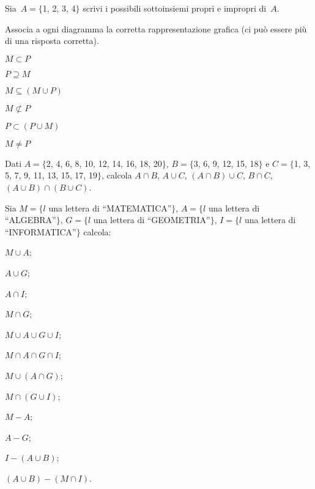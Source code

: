 \begin{esercizio}
\label{ese:5.96}
Sia~$A=\{$1, 2, 3, 4$\}$ scrivi i possibili sottoinsiemi propri e impropri di~$A$.
\end{esercizio}
\pagebreak
\begin{esercizio}
\label{ese:5.97}
Associa a ogni diagramma la corretta rappresentazione grafica (ci può essere più di una risposta corretta).

\TabPositions{5cm}
\begin{enumeratea}
 \item $M\subset P$ \tab\boxA\quad\boxB\quad\boxC\quad\boxD\quad\boxE
\item $P\supseteq M$ \tab\boxA\quad\boxB\quad\boxC\quad\boxD\quad\boxE
\item $M\subseteq (M\cup P)$ \tab\boxA\quad\boxB\quad\boxC\quad\boxD\quad\boxE
\item $M\not\subset P$ \tab\boxA\quad\boxB\quad\boxC\quad\boxD\quad\boxE
\item $P\subset (P\cup M)$ \tab\boxA\quad\boxB\quad\boxC\quad\boxD\quad\boxE
\item $M\neq P$ \tab\boxA\quad\boxB\quad\boxC\quad\boxD\quad\boxE
\end{enumeratea}
\begin{center}

\end{center}
\end{esercizio}

\begin{esercizio}
\label{ese:5.98}
Dati $A=\{$2, 4, 6, 8, 10, 12, 14, 16, 18, 20$\}$, $B=\{$3, 6, 9, 12, 15, 18$\}$ e
$C=\{$1, 3, 5, 7, 9, 11, 13, 15, 17, 19$\}$, calcola
$A\cap B$, $A\cup C$, $(A\cap B)\cup C$, $B\cap C$, $(A\cup B)\cap(B\cup C)$.
\end{esercizio}

\begin{esercizio}
\label{ese:5.99}
Sia $M=\{l$ una lettera di ``MATEMATICA''$\}$, $A=\{l$ una lettera di ``ALGEBRA''$\}$, $G=\{l$ una lettera di ``GEOMETRIA''$\}$, $I=\{l$ una lettera di ``INFORMATICA''$\}$ calcola:
\begin{multicols}{3}
\begin{enumeratea}
 \item $M\cup A$;
 \item $A\cup G$;
 \item $A\cap I$;
 \item $M\cap G$;
 \item $M\cup A \cup G \cup I$;
 \item $M\cap A \cap G \cap I$;
 \item $M\cup (A\cap G)$;
 \item $M\cap (G\cup I)$;
 \item $M-A$;
 \item $A-G$;
 \item $I-(A\cup B)$;
 \item $(A\cup B)-(M\cap I)$.
\end{enumeratea}
\end{multicols}
\end{esercizio}

